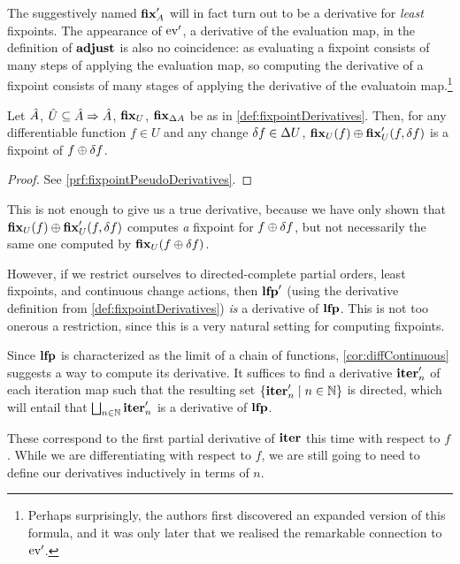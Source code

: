 The suggestively named $\mathbf{fix}_A'$ will in fact turn out to be a
derivative \textemdash{} for \emph{least} fixpoints. The appearance of
$\operatorname{ev}'$, a derivative of the evaluation map, in the definition of
$\mathbf{adjust}$ is also no coincidence: as evaluating a fixpoint consists of many
steps of applying the evaluation map, so computing the derivative of a fixpoint
consists of many stages of applying the derivative of the evaluatoin
map.\footnote{Perhaps surprisingly, the authors first discovered an expanded
  version of this formula, and it was only later that we realised the remarkable
  connection to $\operatorname{ev}'$.}

\begin{thm}[name=Pseudo-derivatives of fixpoints, restate=fixpointPseudoDerivatives]
\label{thm:fixpointPseudoDerivatives}
  Let $\hat{A}$, $\hat{U} \subseteq \hat{A} \Rightarrow \hat{A}$, $\mathbf{fix}_{U}$,
  $\mathbf{fix}_{\Delta A}$ be as in \cref{def:fixpointDerivatives}. Then, for any
  differentiable function $f \in U$ and any change $\delta f \in \Delta U$,
  $\mathbf{fix}_U(f) \oplus \mathbf{fix}_U'(f, \delta f)$ is a fixpoint
  of $f \oplus \delta f$.
\end{thm}
\ifproofs
\begin{proof}
  See \cref{prf:fixpointPseudoDerivatives}.
\end{proof}
\fi

This is not enough to give us a true derivative, because we have only shown
that $\mathbf{fix}_U(f) \oplus \mathbf{fix}_U'(f, \delta f)$ computes \emph{a} 
fixpoint for $f \oplus \delta f$, but not necessarily
the same one computed by $\mathbf{fix}_U{(f \oplus \delta f)}$.

However, if we restrict ourselves to directed-complete partial orders, least
fixpoints, and continuous change actions, then $\mathbf{lfp}'$ (using the
derivative definition from \cref{def:fixpointDerivatives}) \emph{is} a
derivative of $\mathbf{lfp}$. This is not too onerous a restriction, since this is
a very natural setting for computing fixpoints.

Since $\mathbf{lfp}$ is characterized as the limit of a chain of functions,
\cref{cor:diffContinuous} suggests a way to compute its derivative. It suffices to find a derivative
$\mathbf{iter}_n'$ of each iteration map 
such that the resulting set $\{ \mathbf{iter}_n' \mid n \in \mathbb{N}\}$ is directed, 
which will entail that $\bigsqcup_{n \in \mathbb{N}}\mathbf{iter}_n'$ is a derivative of $\mathbf{lfp}$.

These correspond to the first partial derivative of $\mathbf{iter}$ \textemdash{} this time with respect to
$f$. While we are differentiating with respect to $f$, we are still going to
need to define our derivatives inductively in terms of $n$.

